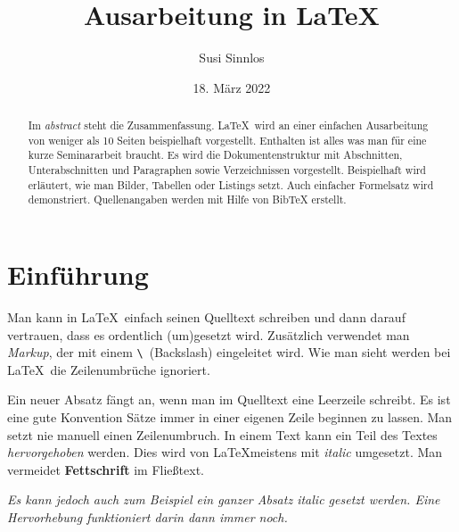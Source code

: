 \documentclass[11pt,a4paper]{article} %
\title{Ausarbeitung in \LaTeX}
\author{Susi Sinnlos}
\date{18. März 2022} %
\begin{document}
\maketitle %

\begin{abstract}
Im \emph{abstract} steht die Zusammenfassung.
\LaTeX\ wird an einer einfachen Ausarbeitung von
weniger als 10 Seiten beispielhaft vorgestellt.
Enthalten ist alles was man für eine kurze Seminararbeit braucht.
Es wird die Dokumentenstruktur mit Abschnitten, Unterabschnitten
und Paragraphen sowie Verzeichnissen vorgestellt.
Beispielhaft wird erläutert, wie man Bilder, Tabellen oder Listings 
setzt.
Auch einfacher Formelsatz wird demonstriert.
Quellenangaben werden mit Hilfe von BibTeX erstellt.
\end{abstract}

\tableofcontents %
\newpage %


\section{Einführung} \label{sec:einf} 

Man kann in \LaTeX\ einfach %
seinen Quelltext schreiben und dann darauf vertrauen, dass es ordentlich 
(um)gesetzt wird. 
Zusätzlich verwendet man \emph{Markup}, der mit einem 
\verb|\|~(Backslash) eingeleitet wird.
Wie man sieht werden bei \LaTeX\ die Zeilenumbrüche ignoriert.

Ein neuer Absatz fängt an, wenn man im Quelltext eine Leerzeile schreibt.
Es ist eine gute Konvention Sätze immer in einer eigenen Zeile beginnen 
zu lassen. Man setzt nie manuell einen Zeilenumbruch.
In einem Text kann ein Teil des Textes \emph{hervorgehoben} werden.
Dies wird von \LaTeX meistens mit \textit{italic} umgesetzt. 
Man vermeidet \textbf{Fettschrift} im Fließtext.

\textit{Es kann jedoch auch zum Beispiel ein ganzer Absatz
  \textit{italic} gesetzt werden. 
  Eine \emph{Hervorhebung} funktioniert darin dann immer noch.
}
\end{document}
